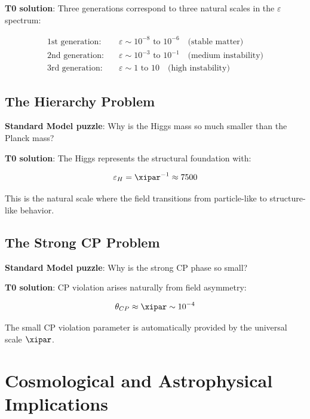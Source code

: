 	\textbf{T0 solution}: Three generations correspond to three natural scales in the $\varepsilon$ spectrum:
	
	\begin{align}
		\text{1st generation}: \quad &\varepsilon \sim 10^{-8} \text{ to } 10^{-6} \quad \text{(stable matter)} \\
		\text{2nd generation}: \quad &\varepsilon \sim 10^{-3} \text{ to } 10^{-1} \quad \text{(medium instability)} \\
		\text{3rd generation}: \quad &\varepsilon \sim 1 \text{ to } 10 \quad \text{(high instability)}
	\end{align}
	
	\subsection{The Hierarchy Problem}
	
	\textbf{Standard Model puzzle}: Why is the Higgs mass so much smaller than the Planck mass?
	
	\textbf{T0 solution}: The Higgs represents the structural foundation with:
	
	\begin{equation}
		\varepsilon_H = \xipar^{-1} \approx 7500
		\label{eq:higgs_epsilon}
	\end{equation}
	
	This is the natural scale where the field transitions from particle-like to structure-like behavior.
	
	\subsection{The Strong CP Problem}
	
	\textbf{Standard Model puzzle}: Why is the strong CP phase so small?
	
	\textbf{T0 solution}: CP violation arises naturally from field asymmetry:
	
	\begin{equation}
		\theta_{CP} \approx \xipar \sim 10^{-4}
		\label{eq:cp_phase}
	\end{equation}
	
	The small CP violation parameter is automatically provided by the universal scale $\xipar$.
	
	\section{Cosmological and Astrophysical Implications}
	
